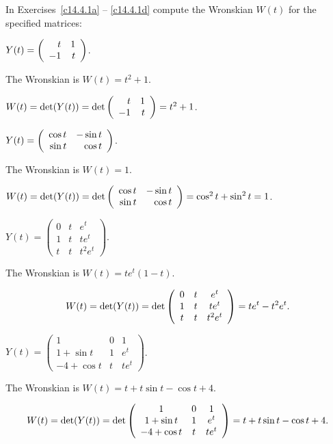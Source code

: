 \documentclass{ximera}
\begin{document}
In Exercises~\ref{c14.4.1a} -- \ref{c14.4.1d} compute the Wronskian
$W(t)$ for the specified matrices:

\begin{exercise} \label{c14.4.1a}
$Y(t) = \left(\begin{array}{rr} t & 1\\ -1 &t\end{array}\right)$.

\begin{solution}
\ans The Wronskian is $W(t) = t^2 + 1$.

\soln $W(t) = \det(Y(t)) = \det\left(\begin{array}{rr} t & 1\\ -1 &t\end{array}\right) = t^2 + 1$.

\end{solution}
\end{exercise}

\begin{exercise} \label{c14.4.1b}
$Y(t) = \left(\begin{array}{rr} \cos t & -\sin t\\ \sin t &\cos t\end{array}\right)$.

\begin{solution}
\ans The Wronskian is $W(t) = 1$.

\soln $W(t) = \det(Y(t)) = \det\left(\begin{array}{rr} \cos t & -\sin t\\ \sin t &\cos t\end{array}\right) =
\cos^2 t + \sin^2 t = 1$.

\end{solution}
\end{exercise}

\begin{exercise} \label{c14.4.1c}
$Y(t) = \left(\begin{array}{ccc}
0 & t & e^t\\  1 & t & te^t \\ t & t & t^2 e^t \end{array}\right)$.

\begin{solution}
\ans The Wronskian is $W(t) = te^t(1 - t)$.

\soln
\[
W(t) = \det(Y(t)) = \det\left(\begin{array}{ccc} 0 & t & e^t \\ 1 & t & te^t \\ t & t & t^2e^t\end{array}\right)
= te^t - t^2e^t.
\]

\end{solution}
\end{exercise}

\begin{exercise} \label{c14.4.1d}
$Y(t) = \left(\begin{array}{ccc}
1 & 0 & 1\\  1 + \sin t & 1 & e^t \\ -4 + \cos t & t & te^t 
\end{array}\right)$.

\begin{solution}
\ans The Wronskian is $W(t) = t + t\sin t - \cos t + 4$.

\soln
\[
W(t) = \det(Y(t)) =
\det\left(\begin{array}{ccc} 1 & 0 & 1 \\ 1 + \sin t & 1 & e^t \\ -4 + \cos t & t & te^t\end{array}\right) =
t + t\sin t - \cos t + 4.
\]

\end{solution}
\end{exercise}
\end{document}
